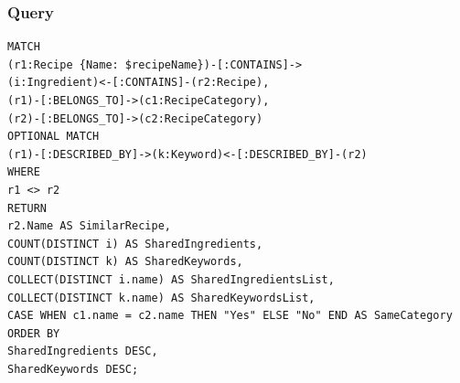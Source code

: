 \begin{enumerate}
    \subsubsection{Query}
    \begin{verbatim}
MATCH 
(r1:Recipe {Name: $recipeName})-[:CONTAINS]->
(i:Ingredient)<-[:CONTAINS]-(r2:Recipe),
(r1)-[:BELONGS_TO]->(c1:RecipeCategory),
(r2)-[:BELONGS_TO]->(c2:RecipeCategory)
OPTIONAL MATCH 
(r1)-[:DESCRIBED_BY]->(k:Keyword)<-[:DESCRIBED_BY]-(r2)
WHERE 
r1 <> r2
RETURN 
r2.Name AS SimilarRecipe, 
COUNT(DISTINCT i) AS SharedIngredients, 
COUNT(DISTINCT k) AS SharedKeywords, 
COLLECT(DISTINCT i.name) AS SharedIngredientsList, 
COLLECT(DISTINCT k.name) AS SharedKeywordsList, 
CASE WHEN c1.name = c2.name THEN "Yes" ELSE "No" END AS SameCategory
ORDER BY 
SharedIngredients DESC, 
SharedKeywords DESC;
    \end{verbatim}

\end{enumerate}
